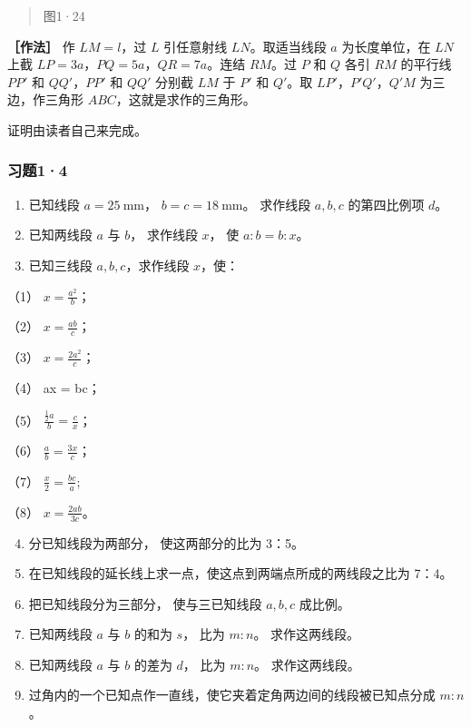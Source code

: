 \begin{quote}
图1·24
\end{quote}

\textbf{［作法］} 作 \(LM = l\)，过 \(L\) 引任意射线 \(LN\)。取适当线段
\(a\) 为长度单位，在 \(LN\) 上截
\(LP = 3a\)，\(PQ = 5a\)，\(QR = 7a\)。连结 \(RM\)。过 \(P\) 和 \(Q\)
各引 \(RM\) 的平行线 \(PP'\) 和 \(QQ'\)，\(PP'\) 和 \(QQ'\) 分别截
\(LM\) 于 \(P'\) 和 \(Q'\)。取 \(LP'\)，\(P'Q'\)，\(Q'M\)
为三边，作三角形 \(ABC\)，这就是求作的三角形。

证明由读者自己来完成。

\subsubsection{习题1·4}

\begin{enumerate}
\item
  已知线段 \(a = 25 \mathrm{~mm}\)， \(b = c = 18 \mathrm{~mm}\)。
  求作线段 \(a, b, c\) 的第四比例项 \(d\)。
\item
  已知两线段 \(a\) 与 \(b\)， 求作线段 \(x\)， 使 \(a:b = b:x\)。
\item
  已知三线段 \(a, b, c\)，求作线段 \(x\)，使：
\end{enumerate}

（1） \(x = \frac{a^2}{b}\)；

（2） \(x = \frac{ab}{c}\)；

（3） \(x = \frac{2a^2}{c}\)；

（4） ax = bc；

（5） \(\frac{\frac{1}{2}a}{b} = \frac{c}{x}\)；

（6） \(\frac{a}{b} = \frac{3x}{c}\)；

（7） \(\frac{x}{2} = \frac{bc}{a};\)

（8） \(x = \frac{2ab}{3c}\)。

\begin{enumerate}
\setcounter{enumi}{3}
\item
  分已知线段为两部分， 使这两部分的比为 3：5。
\item
  在已知线段的延长线上求一点，使这点到两端点所成的两线段之比为 7：4。
\item
  把已知线段分为三部分， 使与三已知线段 \(a, b, c\) 成比例。
\item
  已知两线段 \(a\) 与 \(b\) 的和为 \(s\)， 比为 \(m:n\)。 求作这两线段。
\item
  已知两线段 \(a\) 与 \(b\) 的差为 \(d\)， 比为 \(m:n\)。 求作这两线段。
\item
  过角内的一个已知点作一直线，使它夹着定角两边间的线段被已知点分成
  \(m:n\)。
\end{enumerate}

